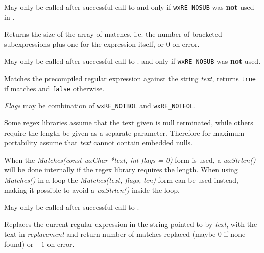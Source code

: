 May only be called after successful call to  
and only if {\tt wxRE\_NOSUB} was {\bf not} used in 
.

\label{wxregexgetmatchcount}


Returns the size of the array of matches, i.e. the number of bracketed
subexpressions plus one for the expression itself, or $0$ on error.

May only be called after successful call to .
and only if {\tt wxRE\_NOSUB} was {\bf not} used.

\label{wxregexmatches}




Matches the precompiled regular expression against the string {\it text},
returns {\tt true} if matches and {\tt false} otherwise.

{\it Flags} may be combination of {\tt wxRE\_NOTBOL} and {\tt wxRE\_NOTEOL}.

Some regex libraries assume that the text given is null terminated, while
others require the length be given as a separate parameter. Therefore for
maximum portability assume that {\it text} cannot contain embedded nulls.

When the {\it Matches(const wxChar *text, int flags = 0)} form is used,
a {\it wxStrlen()} will be done internally if the regex library requires the
length. When using {\it Matches()} in a loop
the {\it Matches(text, flags, len)} form can be used instead, making it
possible to avoid a {\it wxStrlen()} inside the loop.

May only be called after successful call to .

\label{wxregexreplace}


Replaces the current regular expression in the string pointed to by
{\it text}, with the text in {\it replacement} and return number of matches
replaced (maybe $0$ if none found) or $-1$ on error.

